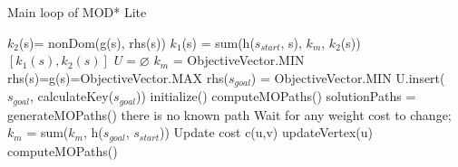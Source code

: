 \documentclass[10pt,journal]{IEEEtran}
\begin{document}
\begin{algorithm}
	\caption{Main loop of MOD* Lite}
	\label{algMain}
	{\fontsize{9}{9}\selectfont
    \begin{algorithmic}[1] %
      	\State $k_{2}$(s)= nonDom(g(s), rhs(s))
      	\State $k_{1}$(s) = sum(h($s_{start}$, s), $k_{m}$, $k_{2}$(s))
      	\State \Return $[k_{1}(s), k_{2}(s)]$
      \EndFunction
   	  \Statex
      	\State $U = \varnothing $
      	\State $k_{m}$ = ObjectiveVector.MIN
     		\State rhs(s)=g(s)=ObjectiveVector.MAX
     	\EndFor
      	\State rhs($s_{goal}$) = ObjectiveVector.MIN
      	\State U.insert($s_{goal}$, calculateKey($s_{goal}$))
	  \EndFunction
	  \Statex
      	\State initialize()
      	\State computeMOPaths()
    	      	\State solutionPaths = generateMOPaths()
    	      	 there is no known path \EndIf
    	      	\State Wait for any weight cost to change;
    	      		\State $k_{m}$ = sum($k_{m}$, h($s_{goal}$, $s_{start}$))
    	      			\State Update cost c(u,v)
    	      			\State updateVertex(u)
    	      		\EndFor
		      	\State computeMOPaths()
    	      	\EndIf
		\EndWhile
  	  \EndFunction
    \end{algorithmic}}
\end{algorithm}
\end{document}
